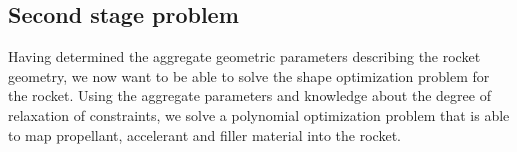 \subsection{Second stage problem}

Having determined the aggregate geometric parameters describing the rocket geometry, we
now want to be able to solve the shape optimization problem for the rocket. Using
the aggregate parameters and knowledge about the degree of relaxation of constraints,
we solve a polynomial optimization problem that is able to map propellant, accelerant
and filler material into the rocket.

